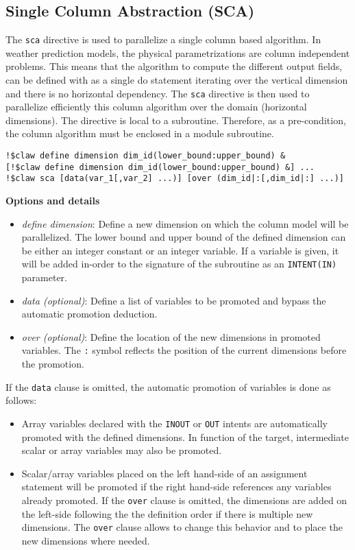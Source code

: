 \subsection{Single Column Abstraction (SCA)}

The \lstinline!sca! directive is used to parallelize a single column based
algorithm. In weather prediction models, the physical parametrizations are
column independent problems. This means that the algorithm to compute the
different output fields, can be defined with as a single do statement
iterating over the vertical dimension and there is no horizontal dependency.
The \lstinline!sca! directive is then used to parallelize efficiently
this column algorithm over the domain (horizontal dimensions).
The directive is local to a subroutine. Therefore, as a pre-condition, the
column algorithm must be enclosed in a module subroutine.

\begin{lstlisting}
!$claw define dimension dim_id(lower_bound:upper_bound) &
[!$claw define dimension dim_id(lower_bound:upper_bound) &] ...
!$claw sca [data(var_1[,var_2] ...)] [over (dim_id|:[,dim_id|:] ...)]
\end{lstlisting}

\textbf{Options and details}
\begin{itemize}
\item \textit{define dimension}: Define a new dimension on which the column
model will be parallelized. The lower bound and upper bound of the defined
dimension can be either an integer constant or an integer variable. If a
variable is given, it will be added in-order to the signature of the subroutine
as an \lstinline!INTENT(IN)! parameter.
\item \textit{data (optional)}: Define a list of variables to be promoted and
bypass the automatic promotion deduction.
\item \textit{over (optional)}: Define the location of the new dimensions in
promoted variables. The \lstinline!:! symbol reflects the position of the
current dimensions before the promotion.
\end{itemize}

If the \lstinline!data! clause is omitted, the automatic promotion of variables
is done as follows:
\begin{itemize}
\item Array variables declared with the \lstinline!INOUT! or \lstinline!OUT!
intents are automatically promoted with the defined dimensions.
In function of the target, intermediate scalar or array variables may also be
promoted.
\item Scalar/array variables placed on the left hand-side of an assignment
statement will be promoted if the right hand-side references any variables
already promoted. If the \lstinline!over! clause is omitted, the dimensions are
added on the left-side following the the definition order if there is multiple
new dimensions. The \lstinline!over! clause allows to change this behavior and
to place the new dimensions where needed.
\end{itemize}


